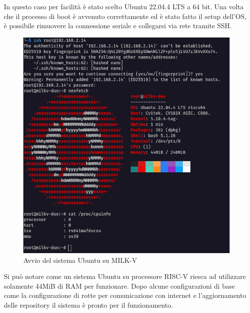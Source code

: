 \FloatBarrier
\vspace{1cm}
In questo caso per facilità è stato scelto Ubuntu 22.04.4 LTS a 64 bit. Una volta che il processo di boot è avvenuto correttamente ed è stato fatto il setup dell'OS, è possibile rimuovere la connessione seriale e collegarsi via rete tramite SSH.
\FloatBarrier
\vspace{1cm}
\begin{figure}[!htbp]
    \centering
    \includegraphics[width=0.5\linewidth]{images/ubuntu-milkv.png}
    \caption{Avvio del sistema Ubuntu su MILK-V}
\end{figure}
\vspace{1cm}
\FloatBarrier
Si può notare come un sistema Ubuntu su processore RISC-V riesca ad utilizzare solamente 44MiB di RAM per funzionare. Dopo alcune configurazioni di base come la configurazione di rotte per comunicazione con internet e l'aggiornamento delle repository il sistema è pronto per il funzionamento.
